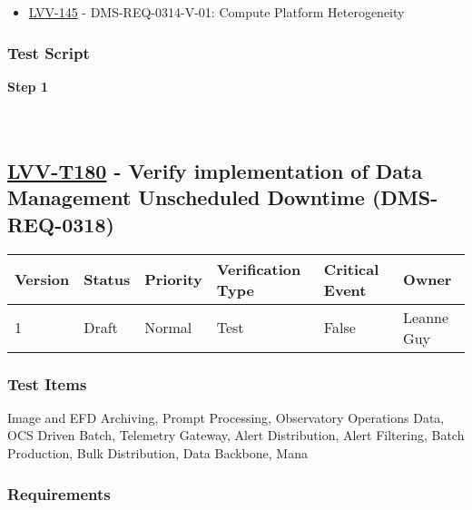 \begin{itemize}
\tightlist
\item
  \href{https://jira.lsstcorp.org/browse/LVV-145}{LVV-145} -
  DMS-REQ-0314-V-01: Compute Platform Heterogeneity
\end{itemize}

\hypertarget{test-script-156}{%
\subsubsection{Test Script}\label{test-script-156}}

\textbf{Step 1}\\
~\\
~\\

\hypertarget{lvv-t180---verify-implementation-of-data-management-unscheduled-downtime-dms-req-0318}{%
\subsection{\texorpdfstring{\href{https://jira.lsstcorp.org/secure/Tests.jspa\#/testCase/LVV-T180}{LVV-T180}
- Verify implementation of Data Management Unscheduled Downtime
(DMS-REQ-0318)}{LVV-T180 - Verify implementation of Data Management Unscheduled Downtime (DMS-REQ-0318)}}\label{lvv-t180---verify-implementation-of-data-management-unscheduled-downtime-dms-req-0318}}

\begin{longtable}[]{@{}llllll@{}}
\toprule
Version & Status & Priority & Verification Type & Critical Event &
Owner\tabularnewline
\midrule
\endhead
1 & Draft & Normal & Test & False & Leanne Guy\tabularnewline
\bottomrule
\end{longtable}

\hypertarget{test-items-156}{%
\subsubsection{Test Items}\label{test-items-156}}

Image and EFD Archiving, Prompt Processing, Observatory Operations Data,
OCS Driven Batch, Telemetry Gateway, Alert Distribution, Alert
Filtering, Batch Production, Bulk Distribution, Data Backbone, Mana

\hypertarget{requirements-157}{%
\subsubsection{Requirements}\label{requirements-157}}

